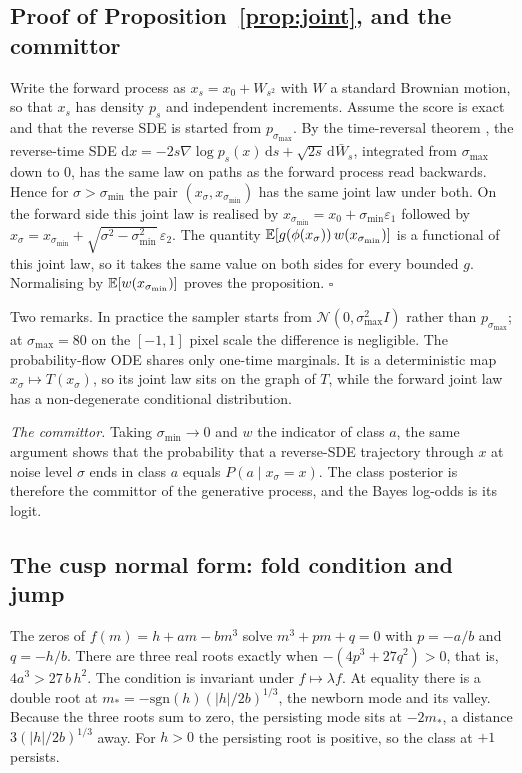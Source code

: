 \subsection{Proof of Proposition~\ref{prop:joint}, and the committor}
\label{app:joint}

Write the forward process as $x_s=x_0+W_{s^2}$ with $W$ a standard Brownian motion, so that $x_s$ has density $p_s$ and independent increments. Assume the score is exact and that the reverse SDE is started from $p_{\sigma_{\max}}$. By the time-reversal theorem \citep{anderson1982reverse,haussmann1986time}, the reverse-time SDE $\mathrm dx=-2s\nabla\log p_s(x)\,\mathrm ds+\sqrt{2s}\,\mathrm d\bar W_s$, integrated from $\sigma_{\max}$ down to $0$, has the same law on paths as the forward process read backwards. Hence for $\sigma>\sigma_{\min}$ the pair $(x_\sigma,x_{\sigma_{\min}})$ has the same joint law under both. On the forward side this joint law is realised by $x_{\sigma_{\min}}=x_0+\sigma_{\min}\varepsilon_1$ followed by $x_\sigma=x_{\sigma_{\min}}+\sqrt{\sigma^2-\sigma_{\min}^2}\,\varepsilon_2$. The quantity $\mathbb{E}[g(\phi(x_\sigma))\,w(x_{\sigma_{\min}})]$ is a functional of this joint law, so it takes the same value on both sides for every bounded $g$. Normalising by $\mathbb{E}[w(x_{\sigma_{\min}})]$ proves the proposition. $\square$

Two remarks. In practice the sampler starts from $\mathcal N(0,\sigma_{\max}^2I)$ rather than $p_{\sigma_{\max}}$; at $\sigma_{\max}=80$ on the $[-1,1]$ pixel scale the difference is negligible. The probability-flow ODE shares only one-time marginals. It is a deterministic map $x_\sigma\mapsto T(x_\sigma)$, so its joint law sits on the graph of $T$, while the forward joint law has a non-degenerate conditional distribution.

\emph{The committor.} Taking $\sigma_{\min}\to0$ and $w$ the indicator of class $a$, the same argument shows that the probability that a reverse-SDE trajectory through $x$ at noise level $\sigma$ ends in class $a$ equals $P(a\mid x_\sigma=x)$. The class posterior is therefore the committor of the generative process, and the Bayes log-odds is its logit.

\subsection{The cusp normal form: fold condition and jump}
\label{app:cusp}

The zeros of $f(m)=h+am-bm^3$ solve $m^3+pm+q=0$ with $p=-a/b$ and $q=-h/b$. There are three real roots exactly when $-(4p^3+27q^2)>0$, that is, $4a^3>27\,b\,h^2$. The condition is invariant under $f\mapsto\lambda f$. At equality there is a double root at $m_\ast=-\mathrm{sgn}(h)(|h|/2b)^{1/3}$, the newborn mode and its valley. Because the three roots sum to zero, the persisting mode sits at $-2m_\ast$, a distance $3(|h|/2b)^{1/3}$ away. For $h>0$ the persisting root is positive, so the class at $+1$ persists.

